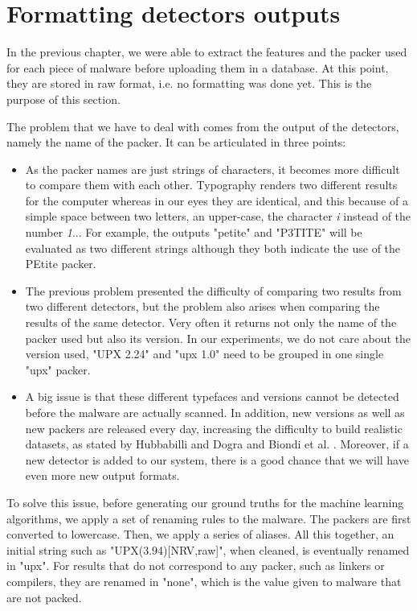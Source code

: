 \section{Formatting detectors outputs}
In the previous chapter, we were able to extract the features and the packer used for each piece of malware before uploading them in a database. At this point, they are stored in raw format, i.e. no formatting was done yet. This is the purpose of this section. 

The problem that we have to deal with comes from the output of the detectors, namely the name of the packer. It can be articulated in three points:
\begin{itemize}
    \item  As the packer names are just strings of characters, it becomes more difficult to compare them with each other. Typography renders two different results for the computer whereas in our eyes they are identical, and this because of a simple space between two letters, an upper-case, the character \textit{i} instead of the number \textit{1}...  For example, the outputs "petite" and "P3TITE" will be evaluated as two different strings although they both indicate the use of the PEtite packer. 
    \item The previous problem presented the difficulty of comparing two results from two different detectors, but the problem also arises when comparing the results of the same detector. Very often it returns not only the name of the packer used but also its version. In our experiments, we do not care about the version used, "UPX 2.24" and "upx 1.0" need to be grouped in one single "upx" packer.
    \item A big issue is that these different typefaces and versions cannot be detected before the malware are actually scanned. In addition, new versions as well as new packers are released every day, increasing the difficulty to build realistic datasets, as stated by Hubbabilli and Dogra \cite{hubballi_detecting_2016} and Biondi et al. \cite{biondi_effective_2019}. Moreover, if a new detector is added to our system, there is a good chance that we will have even more new output formats. 
\end{itemize}

To solve this issue, before generating our ground truths for the machine learning algorithms, we apply a set of renaming rules to the malware. The packers are first converted to lowercase. Then, we apply a series of aliases. All this together, an initial string such as "UPX(3.94)[NRV,raw]", when cleaned, is eventually renamed in "upx". For results that do not correspond to any packer, such as linkers or compilers, they are renamed in "none", which is the value given to malware that are not packed.


